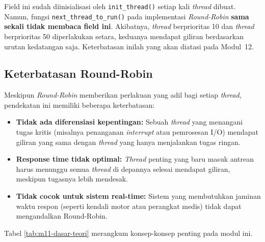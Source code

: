 Field ini sudah diinisialisasi oleh \texttt{init\_thread()} setiap kali \textit{thread} dibuat. Namun, fungsi \texttt{next\_thread\_to\_run()} pada implementasi \textit{Round-Robin} \textbf{sama sekali tidak membaca field ini}. Akibatnya, \textit{thread} berprioritas 10 dan \textit{thread} berprioritas 50 diperlakukan setara, keduanya mendapat giliran berdasarkan urutan kedatangan saja. Keterbatasan inilah yang akan diatasi pada Modul~12.

\subsection{Keterbatasan Round-Robin}
Meskipun \textit{Round-Robin} memberikan perlakuan yang adil bagi setiap \textit{thread}, pendekatan ini memiliki beberapa keterbatasan:
\begin{itemize}
	\item \textbf{Tidak ada diferensiasi kepentingan:} Sebuah \textit{thread} yang menangani tugas kritis (misalnya penanganan \textit{interrupt} atau pemrosesan I/O) mendapat giliran yang sama dengan \textit{thread} yang hanya menjalankan tugas ringan.
	\item \textbf{Response time tidak optimal:} \textit{Thread} penting yang baru masuk antrean harus menunggu semua \textit{thread} di depannya selesai mendapat giliran, meskipun tugasnya lebih mendesak.
	\item \textbf{Tidak cocok untuk sistem real-time:} Sistem yang membutuhkan jaminan waktu respon (seperti kendali motor atau perangkat medis) tidak dapat mengandalkan Round-Robin.
\end{itemize}

Tabel \ref{tab:m11-dasar-teori} merangkum konsep-konsep penting pada modul ini.

